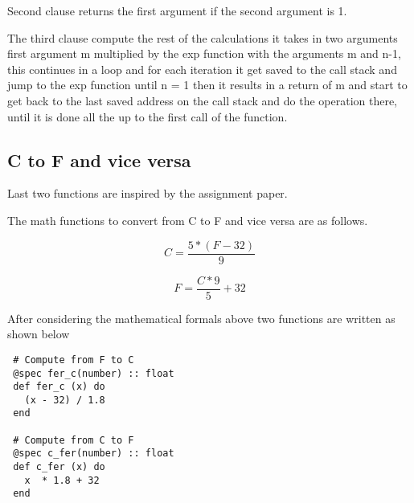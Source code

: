 \documentclass{article}
\begin{document}
Second clause returns the first argument if the second argument is 1.  

The third clause compute the rest of the calculations it takes in two arguments first argument m multiplied by the exp function with the arguments m and n-1, this continues in a loop and for each iteration it get saved to the call stack and jump to the exp function until n = 1 then it results in a return of m and start to get back to the last saved address on the call stack and do the operation there,  until it is done all the up to the first call of the function.

\subsection{C to F and vice versa}

Last two functions are inspired by the assignment paper.

The math functions to convert from C to F and vice versa are as follows.

\[C = \frac{5* (F-32)}{9} \]

\[F = \frac{C*9} {5} + 32 \]

After considering the mathematical formals above two functions are written as shown below  

\begin{verbatim}
 # Compute from F to C
 @spec fer_c(number) :: float
 def fer_c (x) do
   (x - 32) / 1.8
 end

 # Compute from C to F
 @spec c_fer(number) :: float
 def c_fer (x) do
   x  * 1.8 + 32
 end

\end{verbatim} 
\end{document}
